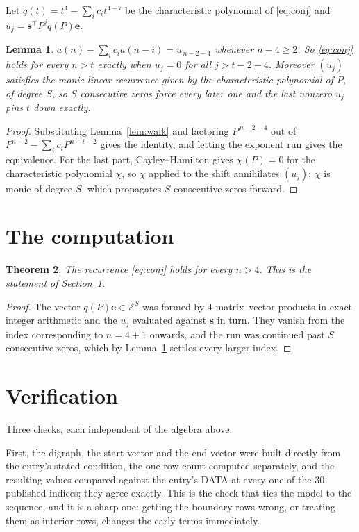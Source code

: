 \documentclass[11pt,a4paper]{article}
\theoremstyle{plain}
\newtheorem{theorem}{Theorem}
\newtheorem{lemma}[theorem]{Lemma}
\theoremstyle{definition}
\begin{document}
Let $q(t)=t^{4}-\sum_i c_i t^{4-i}$ be the characteristic polynomial of
\eqref{eq:conj} and $u_j=\mathbf{s}^{\!\top}P^{j}q(P)\mathbf{e}$.

\begin{lemma}\label{lem:crit}
$a(n)-\sum_i c_i a(n-i)=u_{\,n-2-4}$ whenever $n-4\ge2$. So \eqref{eq:conj}
holds for every $n>t$ exactly when $u_j=0$ for all $j>t-2-4$. Moreover $(u_j)$
satisfies the monic linear recurrence given by the characteristic polynomial of $P$, of
degree $S$, so $S$ consecutive zeros force every later one and the last nonzero $u_j$ pins
$t$ down exactly.
\end{lemma}

\begin{proof}
Substituting Lemma~\ref{lem:walk} and factoring $P^{\,n-2-4}$ out of
$P^{n-2}-\sum_i c_i P^{n-i-2}$ gives the identity, and letting the exponent run gives the
equivalence. For the last part, Cayley--Hamilton gives $\chi(P)=0$ for the characteristic
polynomial $\chi$, so $\chi$ applied to the shift annihilates $(u_j)$; $\chi$ is monic of
degree $S$, which propagates $S$ consecutive zeros forward.
\end{proof}

\section{The computation}

\begin{theorem}
The recurrence \eqref{eq:conj} holds for every $n>4$. This is the statement of
Section~1.
\end{theorem}

\begin{proof}
The vector $q(P)\mathbf{e}\in\mathbb{Z}^{S}$ was formed by $4$ matrix--vector
products in exact integer arithmetic and the $u_j$ evaluated against $\mathbf{s}$ in turn.
They vanish from the index corresponding to $n=4+1$ onwards, and the run was continued
past $S$ consecutive zeros, which by Lemma~\ref{lem:crit} settles every larger index.
\end{proof}

\section{Verification}

Three checks, each independent of the algebra above.

First, the digraph, the start vector and the end vector were built directly from the
entry's stated condition, the one-row count computed separately, and the resulting values
compared against the entry's DATA at every one of the $30$ published indices; they
agree exactly. This is the check that ties the model to the sequence, and it is a sharp one:
getting the boundary rows wrong, or treating them as interior rows, changes the early terms
immediately.
\end{document}
